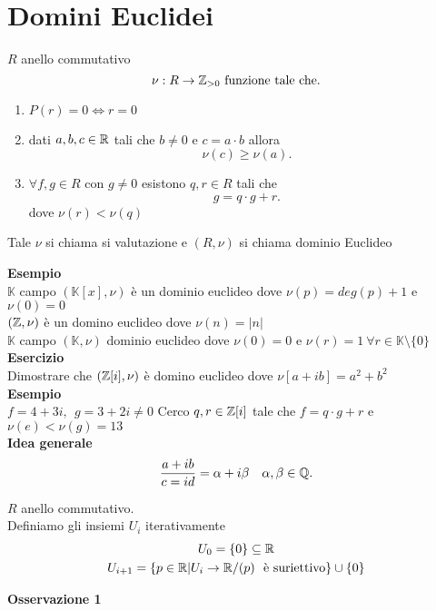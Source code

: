 \documentclass[12px]{article}
\begin{document}
\section{Domini Euclidei}
\begin{defi}
	$R$ anello commutativo\\
	\[
		\nu : R \rightarrow\mathbb{Z}_{>0} \text{ funzione tale che}
	.\] 
	\begin{enumerate}
		\item $P(r) =0 \Leftrightarrow r= 0$\\
		\item dati $a,b,c\in\mathbb{R}$ tali che $b\neq 0$ e  $c = a\cdot b$ allora
			 \[
			\nu (c)\geq \nu(a)
			.\] 
		\item $\forall f,g\in R$ con  $g\neq 0$ esistono $q,r\in R$ tali che 
			 \[
			g = q\cdot g + r
			.\] 
			dove $\nu(r) < \nu (q)$
	\end{enumerate} 
	Tale $\nu$ si chiama si valutazione e $(R,\nu)$ si chiama dominio Euclideo
\end{defi}
\textbf{Esempio}\\
$\mathbb K$ campo  $(\mathbb K[x],\nu)$ è un dominio euclideo dove $\nu(p) = deg(p) + 1$ e  $\nu(0) = 0$ \\
$(\mathbb{Z},\nu)$ è un domino euclideo dove $\nu(n) = |n|$\\
$\mathbb K$ campo  $(\mathbb K,\nu)$ dominio euclideo dove $\nu(0) = 0$ e  $\nu(r) = 1 \  \forall r\in\mathbb K\setminus\{0\}$ \\
\textbf{Esercizio}\\
Dimostrare che $(\mathbb{Z}[i], \nu)$ è domino euclideo dove $\nu[a+ib] = a^2 + b^2$\\
 \textbf{Esempio}\\
 $f = 4 + 3i, \  \ g = 3 + 2i\neq 0$ Cerco  $q,r\in\mathbb{Z}[i] $ tale che $f = q\cdot g + r$ e  $\nu(e)<\nu(g) = 13$\\
 \textbf{Idea generale}
 \[
	 \frac{a + ib}{c = id} = \alpha + i\beta \ \ \ \alpha,\beta\in\mathbb{Q}
 .\] 
 \begin{defi}
 	$R$ anello commutativo.\\
	Definiamo gli insiemi $U_i$ iterativamente\\
	 \begin{gather*}
		 U_0 = \{0\}\subseteq \mathbb{R}\\
		 U_{i+1} = \{p\in\mathbb{R} | U_i  \rightarrow \mathbb{R}/(p) \ \text{ è suriettivo}\}\cup \{0\}
	\end{gather*}
 \end{defi}
 \textbf{Osservazione 1}\\
\end{document}
